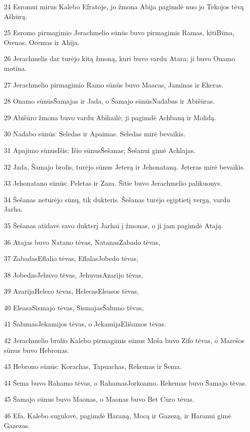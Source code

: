 \par 24 Esromui mirus Kalebo Efratoje, jo žmona Abija pagimdė nuo jo Tekojos tėvą Ašhūrą. 
\par 25 Esromo pirmagimio Jerachmelio sūnūs buvo pirmagimis Ramas, kiti­Būna, Orenas, Ocemas ir Ahija. 
\par 26 Jerachmelis dar turėjo kitą žmoną, kuri buvo vardu Atara; ji buvo Onamo motina. 
\par 27 Jerachmelio pirmagimio Ramo sūnūs buvo Maacas, Jaminas ir Ekeras. 
\par 28 Onamo sūnūs­Šamajas ir Jada, o Šamajo sūnūs­Nadabas ir Abišūras. 
\par 29 Abišūro žmona buvo vardu Abihailė; ji pagimdė Achbaną ir Molidą. 
\par 30 Nadabo sūnūs: Seledas ir Apaimas. Seledas mirė bevaikis. 
\par 31 Apajimo sūnus­Išis; Išio sūnus­Šešanas; Šešanui gimė Achlajas. 
\par 32 Jada, Šamajo brolis, turėjo sūnus Jeterą ir Jehonataną. Jeteras mirė bevaikis. 
\par 33 Jehonatano sūnūs: Peletas ir Zaza. Šitie buvo Jerachmelio palikuonys. 
\par 34 Šešanas neturėjo sūnų, tik dukteris. Šešanas turėjo egiptietį vergą, vardu Jarha. 
\par 35 Šešanas atidavė savo dukterį Jarhai į žmonas, o ji jam pagimdė Atają. 
\par 36 Atajas buvo Natano tėvas, Natanas­Zabado tėvas, 
\par 37 Zabadas­Eflalio tėvas, Eflalas­Jobedo tėvas, 
\par 38 Jobedas­Jehuvo tėvas, Jehuvas­Azarijo tėvas, 
\par 39 Azarija­Heleco tėvas, Helecas­Eleasos tėvas, 
\par 40 Eleasa­Sismajo tėvas, Sismajas­Šalumo tėvas, 
\par 41 Šalumas­Jekamijos tėvas, o Jekamija­Elišamos tėvas. 
\par 42 Jerachmelio brolio Kalebo pirmagimis sūnus Meša buvo Zifo tėvas, o Marešos sūnus buvo Hebronas. 
\par 43 Hebrono sūnūs: Korachas, Tapuachas, Rekemas ir Šema. 
\par 44 Šema buvo Rahamo tėvas, o Rahamas­Jorkoamo. Rekemas buvo Šamajo tėvas. 
\par 45 Šamajo sūnus buvo Maonas, o Maonas buvo Bet Cūro tėvas. 
\par 46 Efa, Kalebo sugulovė, pagimdė Haraną, Mocą ir Gazezą, ir Haranui gimė Gazezas. 
